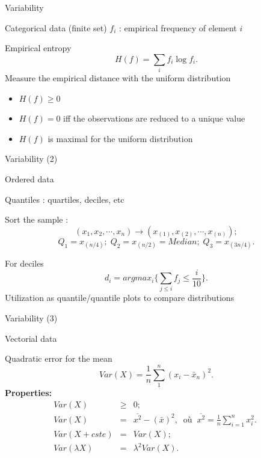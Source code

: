 \documentclass[xcolor=x11names,compress,8pt,
handout
]{beamer}
\def\leq{\leqslant}
\def\geq{\geqslant}
\renewcommand{\(}{\begin{columns}}
\renewcommand{\)}{\end{columns}}
\newcommand{\<}[1]{\begin{column}{#1}}
\renewcommand{\>}{\end{column}}
\begin{document}
\begin{frame}{Variability}
\begin{block}{Categorical data (finite set)}
$f_i$ : empirical frequency of element $i$

Empirical entropy
\[
H(f)=\sum_i f_i \log f_i.\]
Measure the empirical distance with the uniform distribution
\begin{itemize}
\item $H(f)\geq 0$
\item $H(f)=0$ iff the observations are reduced to a unique value
\item $H(f)$ is maximal for the uniform distribution
\end{itemize} 
\end{block}
\end{frame}
\begin{frame}{Variability (2)}
\begin{block}{Ordered data }

Quantiles : quartiles, deciles, etc

Sort the sample : 
\[
(x_1,x_2,\cdots ,x_n)\longrightarrow  (x_{(1)},x_{(2)},\cdots ,x_{(n)});\]
\[
Q_1=x_{(n/4)};\; Q_2=x_{(n/2)}=Median;\; Q_3=x_{(3n/4)}.\]

For deciles
\[
d_i = argmax_i \{\sum_{j\leq i}f_j \leq \frac i {10}\}.\]
Utilization as quantile/quantile plots to compare distributions
\end{block}
\end{frame}
\begin{frame}{Variability (3)}
\begin{block}{ Vectorial data }

Quadratic error for the mean 
\[
Var(X)=\frac 1 n \sum_1^n (x_i-\bar{x}_n)^2.\]
{\bf Properties:}
\begin{eqnarray*}
Var(X) & \geq & 0;\\
Var(X)&=&\overline{x^2}-(\bar{x})^2, \;\;\mbox{o\`u} \;\;\overline{x^2}=\frac 1 n \sum_{i=1}^n x_i^2.\;\\
Var(X+cste)&=&Var(X);\\
Var(\lambda X)&=&\lambda^2 Var(X).
\end{eqnarray*}

\end{block}
\end{frame}
\end{document}
